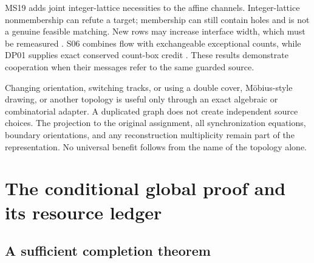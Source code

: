 \documentclass[11pt,letterpaper]{article}
\theoremstyle{definition}
\begin{document}
MS19 adds joint integer-lattice necessities to the affine channels. Integer-lattice nonmembership can refute a target; membership can still contain holes and is not a genuine feasible matching. New rows may increase interface width, which must be remeasured \cite{ms19}. S06 combines flow with exchangeable exceptional counts, while DP01 supplies exact conserved count-box credit \cite{s06,dp01}. These results demonstrate cooperation when their messages refer to the same guarded source.

Changing orientation, switching tracks, or using a double cover, M\"obius-style drawing, or another topology is useful only through an exact algebraic or combinatorial adapter. A duplicated graph does not create independent source choices. The projection to the original assignment, all synchronization equations, boundary orientations, and any reconstruction multiplicity remain part of the representation. No universal benefit follows from the name of the topology alone.

\section{The conditional global proof and its resource ledger}

\subsection{A sufficient completion theorem}
\end{document}

